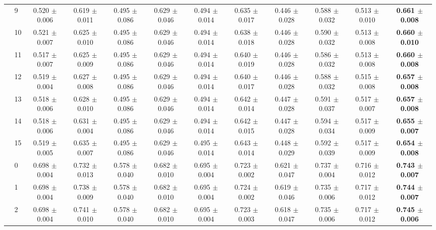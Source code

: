 \begin{table*}[t]
{\begin{tabular}{%
  ll
  @{\quad}
  c@{\hskip 4pt}c
  @{\quad\quad}
  c@{\hskip 4pt}c
  @{\quad\quad}
  c@{\hskip 4pt}c
  @{\quad\quad}
  c@{\hskip 4pt}c
  @{\quad\quad}
  c@{\hskip 4pt}c
}
        & 9 & 0.520 $\pm$ 0.006 & 0.619 $\pm$ 0.011 & 0.495 $\pm$ 0.086 & 0.629 $\pm$ 0.046 & 0.494 $\pm$ 0.014 & 0.635 $\pm$ 0.017 & 0.446 $\pm$ 0.028 & 0.588 $\pm$ 0.032 & 0.513 $\pm$ 0.010 & \textbf{0.661 $\pm$ 0.008} \\
        & 10 & 0.521 $\pm$ 0.007 & 0.625 $\pm$ 0.010 & 0.495 $\pm$ 0.086 & 0.629 $\pm$ 0.046 & 0.494 $\pm$ 0.014 & 0.638 $\pm$ 0.018 & 0.446 $\pm$ 0.028 & 0.590 $\pm$ 0.032 & 0.513 $\pm$ 0.008 & \textbf{0.660 $\pm$ 0.010} \\
        & 11 & 0.517 $\pm$ 0.007 & 0.625 $\pm$ 0.009 & 0.495 $\pm$ 0.086 & 0.629 $\pm$ 0.046 & 0.494 $\pm$ 0.014 & 0.640 $\pm$ 0.019 & 0.446 $\pm$ 0.028 & 0.586 $\pm$ 0.032 & 0.513 $\pm$ 0.008 & \textbf{0.660 $\pm$ 0.008} \\
        & 12 & 0.519 $\pm$ 0.004 & 0.627 $\pm$ 0.008 & 0.495 $\pm$ 0.086 & 0.629 $\pm$ 0.046 & 0.494 $\pm$ 0.014 & 0.640 $\pm$ 0.017 & 0.446 $\pm$ 0.028 & 0.588 $\pm$ 0.032 & 0.515 $\pm$ 0.008 & \textbf{0.657 $\pm$ 0.008} \\
        & 13 & 0.518 $\pm$ 0.006 & 0.628 $\pm$ 0.010 & 0.495 $\pm$ 0.086 & 0.629 $\pm$ 0.046 & 0.494 $\pm$ 0.014 & 0.642 $\pm$ 0.014 & 0.447 $\pm$ 0.028 & 0.591 $\pm$ 0.037 & 0.517 $\pm$ 0.007 & \textbf{0.657 $\pm$ 0.008} \\
        & 14 & 0.518 $\pm$ 0.006 & 0.631 $\pm$ 0.004 & 0.495 $\pm$ 0.086 & 0.629 $\pm$ 0.046 & 0.494 $\pm$ 0.014 & 0.642 $\pm$ 0.015 & 0.447 $\pm$ 0.028 & 0.594 $\pm$ 0.034 & 0.517 $\pm$ 0.009 & \textbf{0.655 $\pm$ 0.007} \\
        & 15 & 0.519 $\pm$ 0.005 & 0.635 $\pm$ 0.007 & 0.495 $\pm$ 0.086 & 0.629 $\pm$ 0.046 & 0.495 $\pm$ 0.014 & 0.643 $\pm$ 0.014 & 0.448 $\pm$ 0.029 & 0.592 $\pm$ 0.039 & 0.517 $\pm$ 0.009 & \textbf{0.654 $\pm$ 0.008} \\
\midrule
\assist{} & 0 & 0.698 $\pm$ 0.004 & 0.732 $\pm$ 0.013 & 0.578 $\pm$ 0.040 & 0.682 $\pm$ 0.010 & 0.695 $\pm$ 0.004 & 0.723 $\pm$ 0.002 & 0.621 $\pm$ 0.047 & 0.737 $\pm$ 0.004 & 0.716 $\pm$ 0.012 & \textbf{0.743 $\pm$ 0.007} \\
        & 1 & 0.698 $\pm$ 0.004 & 0.738 $\pm$ 0.009 & 0.578 $\pm$ 0.040 & 0.682 $\pm$ 0.010 & 0.695 $\pm$ 0.004 & 0.724 $\pm$ 0.002 & 0.619 $\pm$ 0.046 & 0.735 $\pm$ 0.006 & 0.717 $\pm$ 0.012 & \textbf{0.744 $\pm$ 0.007} \\
        & 2 & 0.698 $\pm$ 0.004 & 0.741 $\pm$ 0.010 & 0.578 $\pm$ 0.040 & 0.682 $\pm$ 0.010 & 0.695 $\pm$ 0.004 & 0.723 $\pm$ 0.003 & 0.618 $\pm$ 0.047 & 0.735 $\pm$ 0.006 & 0.717 $\pm$ 0.012 & \textbf{0.745 $\pm$ 0.006} \\

\end{tabular}}
\end{table*}
